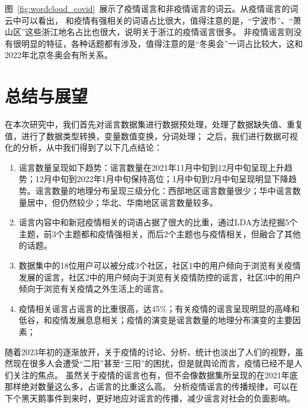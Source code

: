 \documentclass[UTF8]{ctexart}
\begin{document}
图~\ref{fig:wordcloud_covid}~展示了疫情谣言和非疫情谣言的词云。从疫情谣言的词云中可以看出，
和疫情有强相关的词语占比很大，值得注意的是，“宁波市”、“萧山区”这些浙江地名占比也很大，说明关于浙江的疫情谣言很多。
非疫情谣言则没有很明显的特征，各种话题都有涉及，值得注意的是“冬奥会”一词占比较大，这和2022年北京冬奥会有所关系。

\section{总结与展望}

在本次研究中，我们首先对谣言数据集进行数据预处理，处理了数据缺失值、重复值，进行了数据类型转换，变量数值变换，分词处理；
之后，我们进行数据可视化的分析，从中我们得到了以下几点结论：
\begin{enumerate}
    \item 谣言数量呈现如下趋势：谣言数量在2021年11月中旬到12月中旬呈现上升趋势；12月中旬到2022年1月中旬保持高位；1月中旬到2月中旬呈现明显下降趋势。谣言数量的地理分布呈现三级分化：西部地区谣言数量很少；华中谣言数量居中，但仍然较少；华北、华南地区谣言数量较多。
    \item 谣言内容中和新冠疫情相关的词语占据了很大的比重，通过LDA方法挖掘5个主题，前3个主题都和疫情强相关，而后2个主题也与疫情相关，但融合了其他的话题。
    \item 数据集中的18位用户可以被分成3个社区，社区1中的用户倾向于浏览有关疫情发展的谣言，社区2中的用户倾向于浏览有关疫情防控的谣言，社区3中的用户倾向于浏览有关疫情之外生活上的谣言。
    \item 疫情相关谣言占谣言的比重很高，达45\%；有关疫情的谣言呈现明显的高峰和低谷，和疫情发展息息相关；疫情的演变是谣言数量的地理分布演变的主要因素；
\end{enumerate}

随着2023年初的逐渐放开，关于疫情的讨论、分析、统计也淡出了人们的视野，虽然现在很多人会遭受“二阳”甚至“三阳”的困扰，但是就舆论而言，疫情已经不是人们关注的焦点。
虽然关于疫情的谣言也有，但不会像数据集所呈现的在2021年底那样绝对数量这么多，占谣言的比重这么高。
分析疫情谣言的传播规律，可以在下个黑天鹅事件到来时，更好地应对谣言的传播，减少谣言对社会的负面影响。

%
\end{document}
